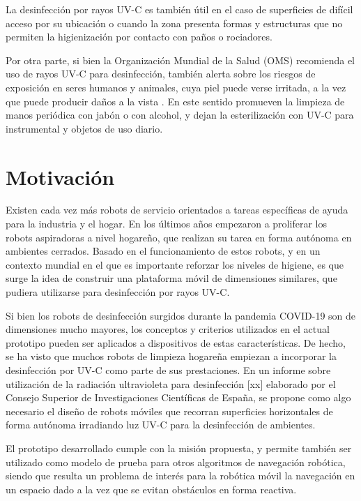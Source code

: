 La desinfección por rayos UV-C es también útil en el caso de superficies de difícil acceso por su ubicación o cuando la zona presenta formas y estructuras que no permiten la higienización por contacto con paños o rociadores. 
 
Por otra parte, si bien la Organización Mundial de la Salud (OMS) recomienda el uso de rayos UV-C para desinfección, también alerta sobre los riesgos de  exposición en seres humanos y animales, cuya piel puede verse irritada, a la vez que puede producir daños a la vista \citep{MYTH}. En este sentido promueven la limpieza de manos periódica con jabón o con alcohol, y dejan la esterilización con UV-C para  instrumental y objetos de uso diario.




\section{Motivación}

Existen cada vez más robots de servicio orientados a tareas específicas de ayuda para la industria y el hogar. En los últimos años empezaron a proliferar los robots aspiradoras a nivel hogareño, que realizan su tarea en forma autónoma en ambientes cerrados. 
Basado en el funcionamiento de estos robots, y en un contexto mundial en el que es importante reforzar los niveles de higiene, es que surge la idea de construir una plataforma móvil de dimensiones similares, que pudiera utilizarse para desinfección por rayos UV-C. 

Si bien los robots de desinfección surgidos durante la pandemia COVID-19 son de dimensiones mucho mayores, los conceptos y criterios utilizados en el actual prototipo pueden ser aplicados a dispositivos de estas características. De hecho, se ha visto que muchos robots de limpieza hogareña empiezan a incorporar la desinfección por UV-C como parte de sus prestaciones. En un informe sobre utilización de la radiación ultravioleta para desinfección [xx] elaborado por el Consejo Superior de Investigaciones Científicas de España, se propone como algo necesario el diseño de robots móviles que recorran superficies horizontales de forma autónoma irradiando luz UV-C para la desinfección de ambientes.

El prototipo desarrollado cumple con la misión propuesta, y permite también ser utilizado como modelo de prueba para otros algoritmos de navegación robótica, siendo que resulta un problema de interés para la robótica móvil la navegación en un espacio dado a la vez que se evitan obstáculos en forma reactiva. 

